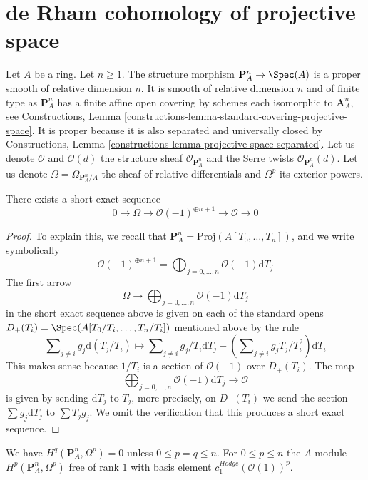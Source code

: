 \section{de Rham cohomology of projective space}
\label{section-projective-space}

\noindent
Let $A$ be a ring. Let $n \geq 1$. The structure morphism
$\mathbf{P}^n_A \to \Spec(A)$ is a proper smooth of relative
dimension $n$. It is smooth of relative dimension $n$ and of finite type
as $\mathbf{P}^n_A$ has a finite affine open covering by schemes each
isomorphic to $\mathbf{A}^n_A$, see Constructions, Lemma
\ref{constructions-lemma-standard-covering-projective-space}.
It is proper because it is also separated and universally closed
by Constructions, Lemma \ref{constructions-lemma-projective-space-separated}.
Let us denote $\mathcal{O}$ and $\mathcal{O}(d)$ the structure sheaf
$\mathcal{O}_{\mathbf{P}^n_A}$ and the Serre twists
$\mathcal{O}_{\mathbf{P}^n_A}(d)$.
Let us denote $\Omega = \Omega_{\mathbf{P}^n_A/A}$ the sheaf
of relative differentials and $\Omega^p$ its exterior powers.

\begin{lemma}
\label{lemma-euler-sequence}
There exists a short exact sequence
$$
0 \to \Omega \to \mathcal{O}(-1)^{\oplus n + 1} \to \mathcal{O} \to 0
$$
\end{lemma}

\begin{proof}
To explain this, we recall that
$\mathbf{P}^n_A = \text{Proj}(A[T_0, \ldots, T_n])$,
and we write symbolically
$$
\mathcal{O}(-1)^{\oplus n + 1} =
\bigoplus\nolimits_{j = 0, \ldots, n} \mathcal{O}(-1) \text{d}T_j
$$
The first arrow
$$
\Omega \to
\bigoplus\nolimits_{j = 0, \ldots, n} \mathcal{O}(-1) \text{d}T_j
$$
in the short exact sequence above
is given on each of the standard opens
$D_+(T_i) = \Spec(A[T_0/T_i, \ldots, T_n/T_i])$
mentioned above by the rule
$$
\sum\nolimits_{j \not = i} g_j \text{d}(T_j/T_i)
\longmapsto
\sum\nolimits_{j \not = i} g_j/T_i \text{d}T_j
- (\sum\nolimits_{j \not = i} g_jT_j/T_i^2) \text{d}T_i
$$
This makes sense because $1/T_i$ is a section of $\mathcal{O}(-1)$
over $D_+(T_i)$. The map
$$
\bigoplus\nolimits_{j = 0, \ldots, n} \mathcal{O}(-1) \text{d}T_j
\to
\mathcal{O}
$$
is given by sending $\text{d}T_j$ to $T_j$, more precisely, on
$D_+(T_i)$ we send the section $\sum g_j \text{d}T_j$ to
$\sum T_jg_j$. We omit the verification that this produces
a short exact sequence.
\end{proof}

\begin{lemma}
\label{lemma-hodge-cohomology-projective-space}
We have $H^q(\mathbf{P}^n_A, \Omega^p) = 0$
unless $0 \leq p = q \leq n$. For $0 \leq p \leq n$ the $A$-module
$H^p(\mathbf{P}^n_A, \Omega^p)$ free of rank $1$ with basis element
$c_1^{Hodge}(\mathcal{O}(1))^p$.
\end{lemma}

